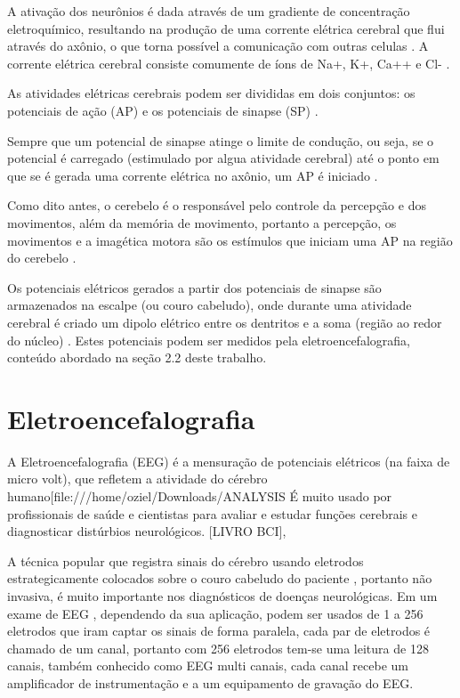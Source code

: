 A ativação dos neurônios é dada através de um gradiente de concentração eletroquímico, resultando na produção de uma corrente elétrica cerebral que flui através do axônio, o que torna possível a comunicação com outras celulas \cite{SIULYDissertacao}. A corrente elétrica cerebral consiste comumente de íons de Na+, K+, Ca++ e Cl- \cite{EEGSignals}.

As atividades elétricas cerebrais podem ser divididas em dois conjuntos: os potenciais de ação (AP) e os potenciais de sinapse (SP) \cite{SIULYDissertacao}.

Sempre que um potencial de sinapse atinge o limite de condução, ou seja, se o potencial é carregado (estimulado por algua atividade cerebral) até o ponto em que se é gerada uma corrente elétrica no axônio, um AP é iniciado \cite{SIULYDissertacao}.

Como dito antes, o cerebelo é o responsável pelo controle da percepção e dos movimentos, além da memória de movimento, portanto a percepção, os movimentos e a imagética motora são os estímulos que iniciam uma AP na região do cerebelo \cite{alvarezneurobiomecanismos}.

Os potenciais elétricos gerados a partir dos potenciais de sinapse são armazenados na escalpe (ou couro cabeludo), onde durante uma atividade cerebral é criado um dipolo elétrico entre os dentritos e a soma (região ao redor do núcleo) \cite{SYULYDissertacao}. Estes potenciais podem ser medidos pela eletroencefalografia, conteúdo abordado na seção 2.2 deste trabalho.

\section{Eletroencefalografia}

A Eletroencefalografia (EEG) é a mensuração de potenciais elétricos
 (na faixa de micro volt), que refletem a atividade do cérebro humano[file:///home/oziel/Downloads/ANALYSIS%
 É muito usado por profissionais de saúde e cientistas para avaliar e estudar
 funções cerebrais e diagnosticar distúrbios neurológicos. [LIVRO BCI],


A técnica popular que registra sinais do cérebro usando eletrodos
 estrategicamente colocados sobre o couro cabeludo do paciente
, portanto não invasiva, é muito importante nos diagnósticos de
 doenças neurológicas. Em um exame de EEG , dependendo da sua
 aplicação, podem ser usados de 1 a 256 eletrodos que iram captar 
os sinais de forma paralela, cada par de eletrodos é chamado de um
 canal, portanto com 256 eletrodos tem-se uma leitura de 128 canais,
 também conhecido como EEG multi canais, cada canal recebe um
 amplificador de instrumentação e a um equipamento de gravação do EEG.


